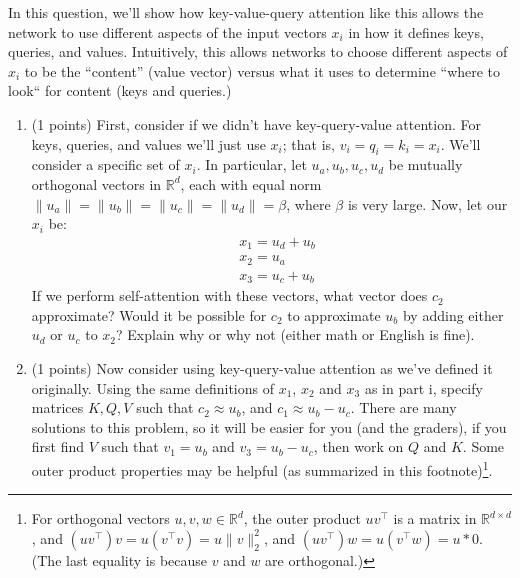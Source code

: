 \begin{enumerate}[(a)]
In this question, we'll show how key-value-query attention like this allows the network to use different aspects of the input vectors $x_i$ in how it defines keys, queries, and values.
Intuitively, this allows networks to choose different aspects of $x_i$ to be the ``content'' (value vector) versus what it uses to determine ``where to look`` for content (keys and queries.)

    \begin{enumerate}[label=\roman*.]
    \item (1 points) First, consider if we didn't have key-query-value attention. For keys, queries, and values we'll just use $x_i$; that is, $v_i=q_i=k_i=x_i$.
    We'll consider a specific set of $x_i$. In particular, let $u_a,u_b,u_c,u_d$ be mutually orthogonal vectors in $\mathbb{R}^d$, each with equal norm $\|u_a\|=\|u_b\|=\|u_c\|=\|u_d\|=\beta$, where $\beta$ is very large. 
    Now, let our $x_i$ be:
    \begin{align}
    &x_1 = u_d + u_b\\
    &x_2 = u_a \\
    &x_3 = u_c + u_b
    \end{align}
    If we perform self-attention with these vectors, what vector does $c_2$ approximate?
    Would it be possible for $c_2$ to approximate $u_b$ by adding either $u_d$ or $u_c$ to $x_2$? Explain why or why not (either math or English is fine).

    \begin{answer}
    \end{answer}


    \item (1 points) Now consider using key-query-value attention as we've defined it originally. Using the same definitions of $x_1$, $x_2$ and $x_3$ as in part i, specify matrices $K,Q,V$ such that $c_2 \approx u_b$, and $c_1\approx u_b - u_c$. There are many solutions to this problem, so it will be easier for you (and the graders), if you first find $V$ such that $v_1 = u_b$ and $v_3 = u_b - u_c$, then work on $Q$ and $K$. Some outer product properties may be helpful (as summarized in this footnote)\footnote{For orthogonal vectors $u,v,w\in\mathbb{R}^d$, the outer product $uv^\top$ is a matrix in $\mathbb{R}^{d\times d}$, and $(uv^\top)v = u(v^\top v)=u\|v\|_2^2$, and $(uv^\top)w = u(v^\top w)=u*0$. (The last equality is because $v$ and $w$ are orthogonal.)}.

    \begin{answer}
    \end{answer}


    \end{enumerate}



\end{enumerate}
